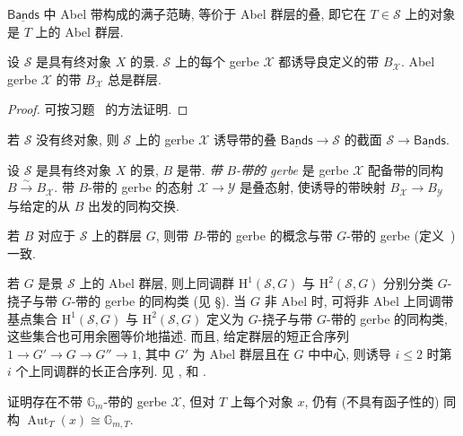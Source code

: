 \begin{remark}\label{src:7.4.31}
$\underline{\mathsf{Bands}}$ 中 Abel 带构成的满子范畴, 等价于 Abel 群层的叠, 即它在 $T\in\mathcal S$ 上的对象是 $T$ 上的 Abel 群层.
\end{remark}
\begin{lemma}[Gerbe 的带]\label{src:7.4.32}
设 $\mathcal S$ 是具有终对象 $X$ 的景. $\mathcal S$ 上的每个 gerbe $\mathcal X$ 都诱导良定义的带 $B_{\mathcal X}$. Abel gerbe $\mathcal X$ 的带 $B_{\mathcal X}$ 总是群层.
\end{lemma}
\begin{proof}
可按习题~ 的方法证明.
\end{proof}
\begin{remark}\label{src:7.4.33}
若 $\mathcal S$ 没有终对象, 则 $\mathcal S$ 上的 gerbe $\mathcal X$ 诱导带的叠 $\underline{\mathsf{Bands}}\to\mathcal S$ 的截面 $\mathcal S\to\underline{\mathsf{Bands}}$.
\end{remark}
\begin{definition}\label{src:7.4.34}
设 $\mathcal S$ 是具有终对象 $X$ 的景, $B$ 是带. \emph{带 $B$-带的 gerbe} 是 gerbe $\mathcal X$ 配备带的同构 $B\xrightarrow{\sim}B_{\mathcal X}$. 带 $B$-带的 gerbe 的态射 $\mathcal X\to\mathcal Y$ 是叠态射, 使诱导的带映射 $B_{\mathcal X}\to B_{\mathcal Y}$ 与给定的从 $B$ 出发的同构交换.
\end{definition}
\begin{remark}\label{src:7.4.35}
若 $B$ 对应于 $\mathcal S$ 上的群层 $G$, 则带 $B$-带的 gerbe 的概念与带 $G$-带的 gerbe (定义~) 一致.
\end{remark}
\begin{remark}[上同调刻画]\label{src:7.4.36}
若 $G$ 是景 $\mathcal S$ 上的 Abel 群层, 则上同调群 $\mathrm H^1(\mathcal S,G)$ 与 $\mathrm H^2(\mathcal S,G)$ 分别分类 $G$-挠子与带 $G$-带的 gerbe 的同构类 (见 \S{}). 当 $G$ 非 Abel 时, 可将非 Abel 上同调带基点集合 $\mathrm H^1(\mathcal S,G)$ 与 $\mathrm H^2(\mathcal S,G)$ 定义为 $G$-挠子与带 $G$-带的 gerbe 的同构类, 这些集合也可用余圈等价地描述. 而且, 给定群层的短正合序列 $1\to G'\to G\to G''\to1$, 其中 $G'$ 为 Abel 群层且在 $G$ 中中心, 则诱导 $i\leq2$ 时第 $i$ 个上同调群的长正合序列. 见 \cite{Gir71}, \cite[144--145 页]{Mil80} 和 \cite[\S12]{Ols16}.
\end{remark}
\begin{exercise}[简单]\label{src:7.4.37}
证明存在不带 $\mathbb G_m$-带的 gerbe $\mathcal X$, 但对 $T$ 上每个对象 $x$, 仍有 (不具有函子性的) 同构 $\operatorname{Aut}_T(x)\cong\mathbb G_{m,T}$.
\end{exercise}
